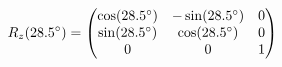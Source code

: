 \documentclass[preview]{standalone}
\begin{document}
\begin{align*}
\special{dvisvgm:raw <g id='unique000'>}R_z(28.5^\circ) = \begin{pmatrix} \cos(28.5^\circ) & -\sin(28.5^\circ) & 0 \\ \sin(28.5^\circ) & \cos(28.5^\circ) & 0 \\ 0 & 0 & 1 \end{pmatrix}\special{dvisvgm:raw </g>}
\end{align*}
\end{document}
